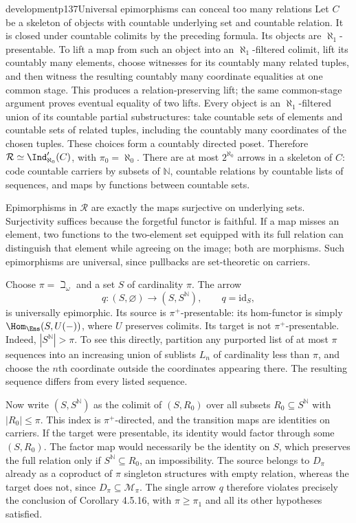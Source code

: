 \begin{dcomment}{development}{p137}{Universal epimorphisms can conceal too many relations}
Let $C$ be a skeleton of objects with countable underlying set and countable relation. It is closed under countable colimits by the preceding formula. Its objects are $\aleph_1$-presentable. To lift a map from such an object into an $\aleph_1$-filtered colimit, lift its countably many elements, choose witnesses for its countably many related tuples, and then witness the resulting countably many coordinate equalities at one common stage. This produces a relation-preserving lift; the same common-stage argument proves eventual equality of two lifts. Every object is an $\aleph_1$-filtered union of its countable partial substructures: take countable sets of elements and countable sets of related tuples, including the countably many coordinates of the chosen tuples. These choices form a countably directed poset. Therefore $\mathcal R\simeq\Ind'_{\aleph_0}(C)$, with $\pi_0=\aleph_0$. There are at most $2^{\aleph_0}$ arrows in a skeleton of $C$: code countable carriers by subsets of $\mathbb N$, countable relations by countable lists of sequences, and maps by functions between countable sets.

Epimorphisms in $\mathcal R$ are exactly the maps surjective on underlying sets. Surjectivity suffices because the forgetful functor is faithful. If a map misses an element, two functions to the two-element set equipped with its full relation can distinguish that element while agreeing on the image; both are morphisms. Such epimorphisms are universal, since pullbacks are set-theoretic on carriers.

Choose $\pi=\beth_\omega$ and a set $S$ of cardinality $\pi$. The arrow
\[
 q:(S,\varnothing)\longrightarrow(S,S^{\mathbb N}),
 \qquad q=\mathrm{id}_S,
\]
is universally epimorphic. Its source is $\pi^+$-presentable: its hom-functor is simply $\Hom_{\Ens}(S,U(-))$, where $U$ preserves colimits. Its target is not $\pi^+$-presentable. Indeed, $|S^{\mathbb N}|>\pi$. To see this directly, partition any purported list of at most $\pi$ sequences into an increasing union of sublists $L_n$ of cardinality less than $\pi$, and choose the $n$th coordinate outside the coordinates appearing there. The resulting sequence differs from every listed sequence.

Now write $(S,S^{\mathbb N})$ as the colimit of $(S,R_0)$ over all subsets $R_0\subseteq S^{\mathbb N}$ with $|R_0|\leq\pi$. This index is $\pi^+$-directed, and the transition maps are identities on carriers. If the target were presentable, its identity would factor through some $(S,R_0)$. The factor map would necessarily be the identity on $S$, which preserves the full relation only if $S^{\mathbb N}\subseteq R_0$, an impossibility. The source belongs to $D_\pi$ already as a coproduct of $\pi$ singleton structures with empty relation, whereas the target does not, since $D_\pi\subseteq\mathcal M_\pi$. The single arrow $q$ therefore violates precisely the conclusion of Corollary 4.5.16, with $\pi\geq\pi_1$ and all its other hypotheses satisfied.


\end{dcomment}
